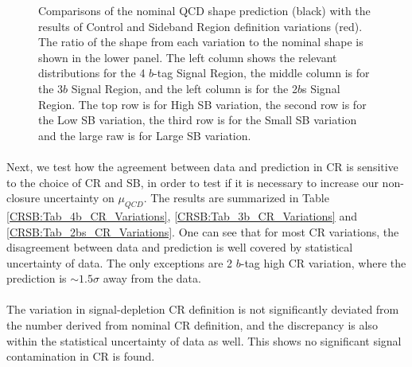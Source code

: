 \begin{figure}[htbp!]
\begin{center}
\end{center}
\caption{Comparisons of the nominal QCD shape prediction (black) with the results of Control and Sideband Region definition variations (red). The ratio of the shape from each variation to the nominal shape is shown in the lower panel. The left column shows the relevant distributions for the 4 $b$-tag Signal Region, the middle column is for the 3$b$ Signal Region, and the left column is for the 2$b$s Signal Region. The top row is for High SB variation, the second row is for the Low SB variation, the third row is for the Small SB variation and the large raw is for Large SB variation.}
\label{CRSB:QCDShapeSR-SB}
\end{figure}

\clearpage
\paragraph{}
Next, we test how the agreement between data and prediction in CR is sensitive to the choice of CR and SB, in order to test if it is necessary to increase our non-closure uncertainty on $\mu_{QCD}$. The results are summarized in Table \ref{CRSB:Tab_4b_CR_Variations}, \ref{CRSB:Tab_3b_CR_Variations} and \ref{CRSB:Tab_2bs_CR_Variations}. One can see that for most CR variations, the disagreement between data and prediction is well covered by statistical uncertainty of data. The only exceptions are 2 $b$-tag high CR variation, where the prediction is $\sim 1.5 \sigma$ away from the data. 

\paragraph{}
The variation in signal-depletion CR definition is not significantly deviated from the number derived from nominal CR definition, and the discrepancy is also within the statistical uncertainty of data as well. This shows no significant signal contamination in CR is found.


\clearpage
